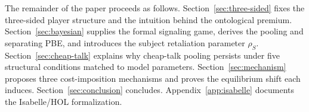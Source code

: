 The remainder of the paper proceeds as follows. Section~\ref{sec:three-sided} fixes the three-sided player structure and the intuition behind the ontological premium. Section~\ref{sec:bayesian} supplies the formal signaling game, derives the pooling and separating PBE, and introduces the subject retaliation parameter $\rho_S$. Section~\ref{sec:cheap-talk} explains why cheap-talk pooling persists under five structural conditions matched to model parameters. Section~\ref{sec:mechanism} proposes three cost-imposition mechanisms and proves the equilibrium shift each induces. Section~\ref{sec:conclusion} concludes. Appendix~\ref{app:isabelle} documents the Isabelle/HOL formalization.
